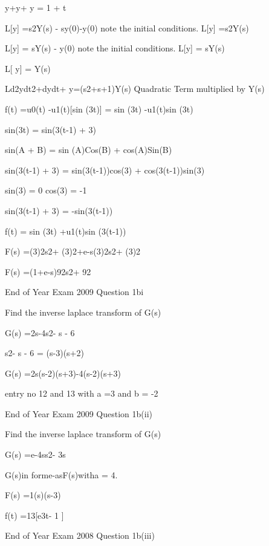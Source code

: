 y+y+ y = 1 + t

 

L[y] =s2Y(s) - sy(0)-y(0)            note the initial conditions. L[y] =s2Y(s)

 

L[y] = sY(s) - y(0)                           note the initial conditions. L[y] = sY(s) 

 

L[ y] = Y(s)

 

Ld2ydt2+dydt+ y=(s2+s+1)Y(s)    Quadratic Term multiplied by Y(s)


 

 



f(t) =u0(t) -u1(t)[sin (3t)] = sin (3t) -u1(t)sin (3t)


sin(3t) = sin(3(t-1) + 3)


sin(A + B) = sin (A)Cos(B) + cos(A)Sin(B) 


sin(3(t-1) + 3) = sin(3(t-1))cos(3) + cos(3(t-1))sin(3)


sin(3) = 0              cos(3) = -1


sin(3(t-1) + 3) = -sin(3(t-1))


f(t) = sin (3t) +u1(t)sin (3(t-1))


F(s) =(3)2s2+ (3)2+e-s(3)2s2+ (3)2


F(s) =(1+e-s)92s2+ 92


 

End of Year Exam  2009 Question 1bi


Find the inverse laplace transform of G(s)


G(s) =2s-4s2- s - 6


s2- s - 6 = (s-3)(s+2)


G(s) =2s(s-2)(s+3)-4(s-2)(s+3)


entry no 12 and 13 with a =3 and b =  -2



End of Year Exam  2009 Question 1b(ii)

Find the inverse laplace transform of G(s)


G(s) =e-4ss2- 3s



G(s)in forme-asF(s)witha = 4.



F(s) =1(s)(s-3)



f(t) =13[e3t- 1 ]


End of Year Exam  2008 Question 1b(iii)



